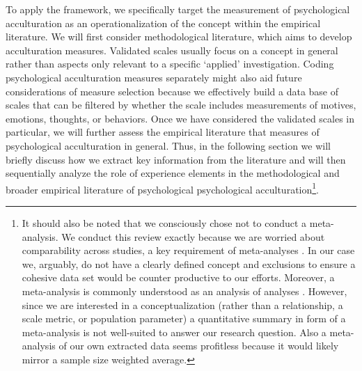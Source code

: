 \documentclass[nobib]{tufte-handout}
\begin{document}
To apply the framework, we specifically target the measurement of psychological acculturation as an operationalization of the concept within the empirical literature. We will first consider methodological literature, which aims to develop acculturation measures. Validated scales usually focus on a concept in general rather than aspects only relevant to a specific `applied' investigation. Coding psychological acculturation measures separately might also aid future considerations of measure selection because we effectively build a data base of scales that can be filtered by whether the scale includes measurements of motives, emotions, thoughts, or behaviors. Once we have considered the validated scales in particular, we will further assess the empirical literature that measures of psychological acculturation in general. Thus, in the following section we will briefly discuss how we extract key information from the literature and will then sequentially analyze the role of experience elements in the methodological and broader empirical literature of psychological psychological acculturation\footnote{It should also be noted that we consciously chose not to conduct a meta-analysis. We conduct this review exactly because we are worried about comparability across studies, a key requirement of meta-analyses \citep{Pogue1998}. In our case we, arguably, do not have a clearly defined concept and exclusions to ensure a cohesive data set would be counter productive to our efforts. Moreover, a meta-analysis is commonly understood as an analysis of analyses \citep{Glass1976}. However, since we are interested in a conceptualization (rather than a relationship, a scale metric, or population parameter) a quantitative summary in form of a meta-analysis is not well-suited to answer our research question. Also a meta-analysis of our own extracted data seems profitless because it would likely mirror a sample size weighted average.}.

\newpage
\printbibliography
\end{document}
